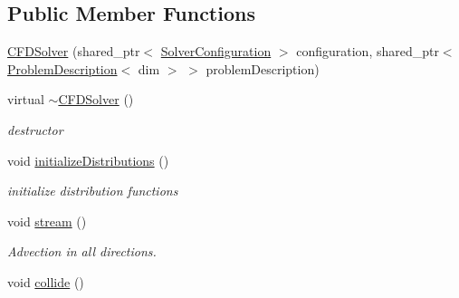 \subsection*{Public Member Functions}
\begin{DoxyCompactItemize}
\item 
\hyperlink{classnatrium_1_1CFDSolver_a9d0e65b8a404ac3eaf80aee6c81945dc}{CFDSolver} (shared\_\-ptr$<$ \hyperlink{classnatrium_1_1SolverConfiguration}{SolverConfiguration} $>$ configuration, shared\_\-ptr$<$ \hyperlink{classnatrium_1_1ProblemDescription}{ProblemDescription}$<$ dim $>$ $>$ problemDescription)
\item 
\hypertarget{classnatrium_1_1CFDSolver_a7ca9bd709255ac87b34f869c984b913b}{
virtual \hyperlink{classnatrium_1_1CFDSolver_a7ca9bd709255ac87b34f869c984b913b}{$\sim$CFDSolver} ()}
\label{classnatrium_1_1CFDSolver_a7ca9bd709255ac87b34f869c984b913b}

\begin{DoxyCompactList}\small\item\em destructor \item\end{DoxyCompactList}\item 
\hypertarget{classnatrium_1_1CFDSolver_abe627b0bbde0635abb30b9bea4c72dc1}{
void \hyperlink{classnatrium_1_1CFDSolver_abe627b0bbde0635abb30b9bea4c72dc1}{initializeDistributions} ()}
\label{classnatrium_1_1CFDSolver_abe627b0bbde0635abb30b9bea4c72dc1}

\begin{DoxyCompactList}\small\item\em initialize distribution functions \item\end{DoxyCompactList}\item 
\hypertarget{classnatrium_1_1CFDSolver_ac32a318e504b31195eb61c2cdc2659fe}{
void \hyperlink{classnatrium_1_1CFDSolver_ac32a318e504b31195eb61c2cdc2659fe}{stream} ()}
\label{classnatrium_1_1CFDSolver_ac32a318e504b31195eb61c2cdc2659fe}

\begin{DoxyCompactList}\small\item\em Advection in all directions. \item\end{DoxyCompactList}\item 
\hypertarget{classnatrium_1_1CFDSolver_ac9bec7d0c4bcd5e02c5213ec09438c02}{
void \hyperlink{classnatrium_1_1CFDSolver_ac9bec7d0c4bcd5e02c5213ec09438c02}{collide} ()}
\label{classnatrium_1_1CFDSolver_ac9bec7d0c4bcd5e02c5213ec09438c02}


\end{DoxyCompactItemize}
